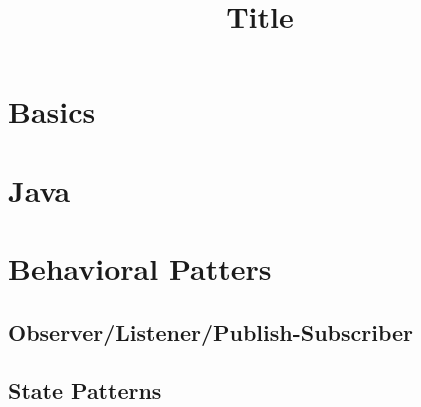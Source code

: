 \documentclass[
    fourColumns,
    landscape,
]{formularyETH/formularyETH}
\title{Title}
\begin{document}
  
  
\section{Basics}
  
\section{Java}
  
  
\newpage
\section{Behavioral Patters}
\label{subsubsec:Behavirol}

\subsection{Observer\slash Listener\slash Publish-Subscriber}
\label{subsubsec:Observer}

\subsection{State Patterns}
\label{subsubsec:StatePatterns}

\end{document}
